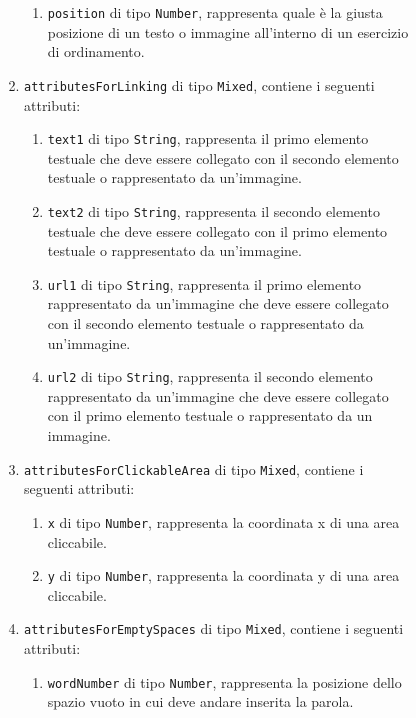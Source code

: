 \begin{itemize}
\begin{itemize}
\begin{itemize}
\begin{itemize}
\begin{enumerate}
\begin{enumerate}
        						\item \texttt{position} di tipo \texttt{Number}, rappresenta quale è la giusta posizione di un testo o immagine all'interno di un esercizio di ordinamento.
						\end{enumerate}  
							\item \texttt{attributesForLinking} di tipo \texttt{Mixed}, contiene i seguenti attributi:
        					\begin{enumerate}
        						\item \texttt{text1} di tipo \texttt{String}, rappresenta il primo elemento testuale che deve essere collegato con il secondo elemento testuale o rappresentato da un'immagine.
        						\item \texttt{text2} di tipo \texttt{String}, rappresenta il secondo elemento testuale che deve essere collegato con il primo elemento testuale o rappresentato da un'immagine.
        						\item \texttt{url1} di tipo \texttt{String}, rappresenta il primo elemento rappresentato da un'immagine che deve essere collegato con il secondo elemento testuale o rappresentato da un'immagine.
        						\item \texttt{url2} di tipo \texttt{String}, rappresenta il secondo elemento rappresentato da un'immagine che deve essere collegato con il primo elemento testuale o rappresentato da un immagine.
						\end{enumerate}  
							\item \texttt{attributesForClickableArea} di tipo \texttt{Mixed}, contiene i seguenti attributi:
        					\begin{enumerate}
        						\item \texttt{x} di tipo \texttt{Number}, rappresenta la coordinata x di una area cliccabile.  
        						\item \texttt{y} di tipo \texttt{Number}, rappresenta la coordinata y di una area cliccabile.  
						\end{enumerate}    
							\item \texttt{attributesForEmptySpaces} di tipo \texttt{Mixed}, contiene i seguenti attributi:
        					\begin{enumerate}
        						\item \texttt{wordNumber} di tipo \texttt{Number}, rappresenta la posizione dello spazio vuoto in cui deve andare inserita la parola.  
						\end{enumerate}        						  						
					\end{enumerate}

\end{itemize}
\end{itemize}
\end{itemize}
\end{itemize}
